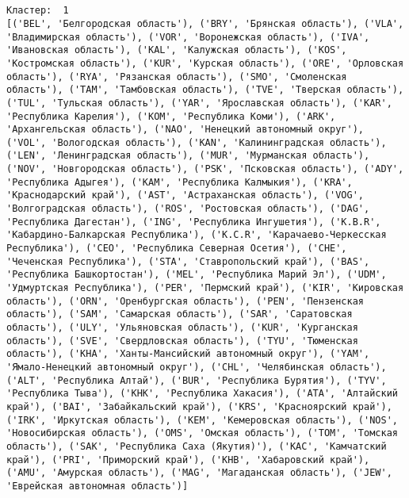 \documentclass[11pt]{article}
\begin{document}
    \begin{center}
    \end{center}
    { \hspace*{\fill} \\}
    
    \begin{Verbatim}[commandchars=\\\{\}]

Кластер:  1
[('BEL', 'Белгородская область'), ('BRY', 'Брянская область'), ('VLA', 'Владимирская область'), ('VOR', 'Воронежская область'), ('IVA', 'Ивановская область'), ('KAL', 'Калужская область'), ('KOS', 'Костромская область'), ('KUR', 'Курская область'), ('ORE', 'Орловская область'), ('RYA', 'Рязанская область'), ('SMO', 'Смоленская область'), ('TAM', 'Тамбовская область'), ('TVE', 'Тверская область'), ('TUL', 'Тульская область'), ('YAR', 'Ярославская область'), ('KAR', 'Республика Карелия'), ('KOM', 'Республика Коми'), ('ARK', 'Архангельская область'), ('NAO', 'Ненецкий автономный округ'), ('VOL', 'Вологодская область'), ('KAN', 'Калинингpадская область'), ('LEN', 'Ленинградская область'), ('MUR', 'Мурманская область'), ('NOV', 'Новгородская область'), ('PSK', 'Псковская область'), ('ADY', 'Республика Адыгея'), ('KAM', 'Республика Калмыкия'), ('KRA', 'Краснодарский край'), ('AST', 'Астраханская область'), ('VOG', 'Волгоградская область'), ('ROS', 'Ростовская область'), ('DAG', 'Республика Дагестан'), ('ING', 'Республика Ингушетия'), ('K.B.R', 'Кабардино-Балкарская Республика'), ('K.C.R', 'Карачаево-Черкесская Республика'), ('CEO', 'Республика Северная Осетия'), ('CHE', 'Чеченская Республика'), ('STA', 'Ставропольский край'), ('BAS', 'Республика Башкортостан'), ('MEL', 'Республика Марий Эл'), ('UDM', 'Удмуртская Республика'), ('PER', 'Пермский край'), ('KIR', 'Кировская область'), ('ORN', 'Оренбургская область'), ('PEN', 'Пензенская область'), ('SAM', 'Самарская область'), ('SAR', 'Саратовская область'), ('ULY', 'Ульяновская область'), ('KUR', 'Курганская область'), ('SVE', 'Свердловская область'), ('TYU', 'Тюменская область'), ('KHA', 'Ханты-Мансийский автономный округ'), ('YAM', 'Ямало-Ненецкий автономный округ'), ('CHL', 'Челябинская область'), ('ALT', 'Республика Алтай'), ('BUR', 'Республика Бурятия'), ('TYV', 'Республика Тыва'), ('KHK', 'Республика Хакасия'), ('ATA', 'Алтайский край'), ('BAI', 'Забайкальский край'), ('KRS', 'Красноярский край'), ('IRK', 'Иркутская область'), ('KEM', 'Кемеровская область'), ('NOS', 'Новосибирская область'), ('OMS', 'Омская область'), ('TOM', 'Томская область'), ('SAK', 'Республика Саха (Якутия)'), ('KAC', 'Камчатский край'), ('PRI', 'Приморский край'), ('KHB', 'Хабаровский край'), ('AMU', 'Амурская область'), ('MAG', 'Магаданская область'), ('JEW', 'Еврейская автономная область')]


\end{Verbatim}
\end{document}
